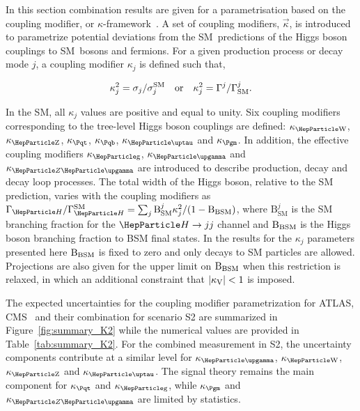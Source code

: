 
In this section combination results are given for a parametrisation based on the coupling modifier, or $\kappa$-framework~\cite{Heinemeyer:2013tqa}. A set of coupling modifiers, $\vec\kappa$, is introduced to parametrize potential deviations from the SM~predictions of the Higgs boson couplings to SM~bosons and fermions. For a given production process or decay mode $j$, a coupling modifier $\kappa_j$ is defined such that,

\begin{equation}
\label{eq:kappa}
  \kappa_j^2=\sigma_j/\sigma_j^\SM\ \ \ {\rm or}\ \ \  \kappa_j^2=\Gamma^j/\Gamma^j_\SM.
\end{equation}

In the SM, all $\kappa_j$ values are positive and equal to unity. Six coupling modifiers corresponding to the tree-level Higgs boson couplings are defined: $\kW$, $\kZ$, $\ktop$, $\kb$, $\ktau$ and $\kmu$. In addition, the effective coupling modifiers $\kglu$, $\kgam$ and $\kzgam$ are introduced to describe \ggh production, \hgg decay and \hzg decay loop processes. 
The total width of the Higgs boson, relative to the SM prediction, varies with the coupling modifiers as $\GammaSM = \sum_{j}\mathrm{B}^{j}_{\text{SM}}\kappa_{j}^{2} / (1 - \Bbsm)$, where $\mathrm{B}^{j}_{\text{SM}}$ is the SM branching fraction for the $\PH\rightarrow jj$ channel and $\mathrm{B_{BSM}}$ is the Higgs boson branching fraction to BSM final states. In the results for the $\kappa_j$ parameters presented here $\mathrm{B_{BSM}}$ is fixed to zero and only decays to SM particles are allowed. Projections are also given for the upper limit on $\mathrm{B_{BSM}}$ when this restriction is relaxed, in which an additional constraint that $|\kappa_{\mathrm{V}}| < 1$ is imposed. 

The expected uncertainties for the coupling modifier parametrization for ATLAS, CMS~\cite{ATL-PHYS-PUB-2018-054,CMS-PAS-FTR-18-011} and their combination for scenario S2 are summarized in Figure~\ref{fig:summary_K2} while the numerical values are provided in Table~\ref{tab:summary_K2}.
For the combined measurement in S2, the uncertainty components  contribute at a similar level for $\kgam$, $\kW$, $\kZ$ and $\ktau$. The signal theory remains the main component for $\ktop$ and $\kglu$, while $\kmu$ and $\kzgam$ are limited by statistics.

